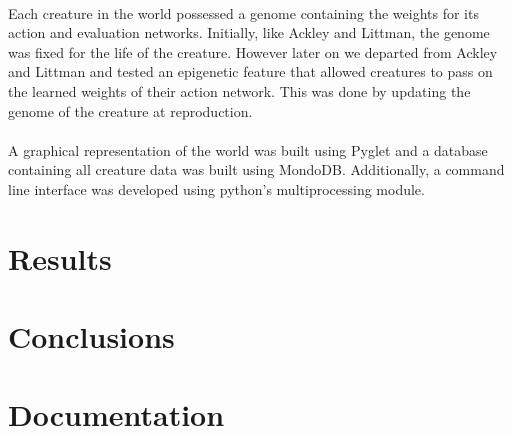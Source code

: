 \documentclass[12pt]{report}
\begin{document}
\paragraph{} Each creature in the world possessed a genome containing the weights for its action and evaluation networks. Initially, like Ackley and Littman, the genome was fixed for the life of the creature. However later on we departed from Ackley and Littman and tested an epigenetic feature that allowed creatures to pass on the learned weights of their action network. This was done by updating the genome of the creature at reproduction.  
\paragraph{} A graphical representation of the world was built using Pyglet and a database containing all creature data was built using MondoDB. Additionally, a command line interface was developed using python's multiprocessing module.

\section*{Results}

\section*{Conclusions}

\section*{Documentation}

{}

\end{document}
